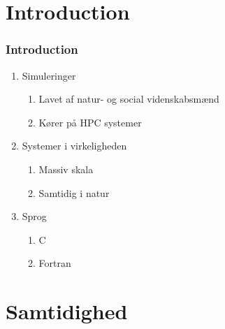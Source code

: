 \section{Introduction}
\begin{frame}
  \frametitle{Introduction}
  \begin{enumerate}
    \item Simuleringer
    \begin{enumerate}
      \item Lavet af natur- og social videnskabsmænd
      \item Kører på HPC systemer
    \end{enumerate}
    \item Systemer i virkeligheden
    \begin{enumerate}
      \item Massiv skala
      \item Samtidig i natur
    \end{enumerate}
    \item Sprog
    \begin{enumerate}
      \item C
      \item Fortran
    \end{enumerate}
  \end{enumerate}
\end{frame}

\section{Samtidighed}
